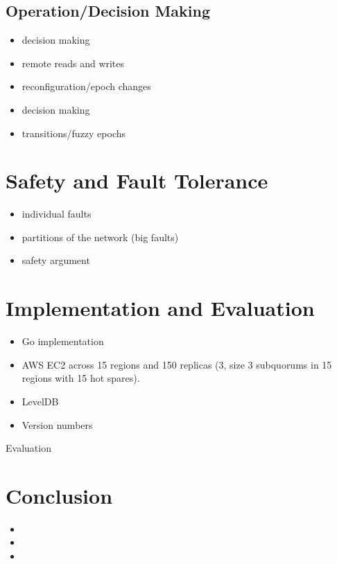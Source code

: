 \documentclass[10pt,twocolumn]{article}
\begin{document}
\subsection*{Operation/Decision Making}

\begin{itemize}
    \item \sub decision making
    \item remote reads and writes
    \item reconfiguration/epoch changes
    \item \roo decision making
    \item transitions/fuzzy epochs
\end{itemize}

\section*{Safety and Fault Tolerance}

\begin{itemize}
    \item individual faults
    \item partitions of the network (big faults)
    \item safety argument
\end{itemize}

\section*{Implementation and Evaluation}

\begin{itemize}
    \item Go implementation
    \item AWS EC2 across 15 regions and 150 replicas (3, size 3 subquorums in 15 regions with 15 hot spares).
    \item LevelDB
    \item Version numbers
\end{itemize}

Evaluation

\section*{Conclusion}

\begin{itemize}
    \item {}
    \item {}
    \item {}
\end{itemize}



\end{document}
